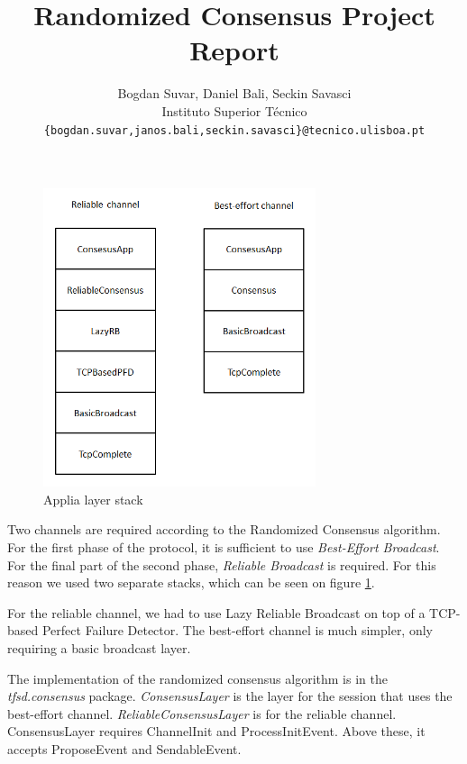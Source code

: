 \documentclass[times, 12pt,twocolumn]{article}
\begin{document}
\title{Randomized Consensus Project Report}

\author{Bogdan Suvar, Daniel Bali, Seckin Savasci\\
Instituto Superior T\'{e}cnico\\
\texttt{\{bogdan.suvar,janos.bali,seckin.savasci\}@tecnico.ulisboa.pt}\\
}
 
\maketitle
\thispagestyle{empty}




\begin{figure}[ht!]
\centering
\includegraphics[width=80mm]{stack.png}
\caption{Applia layer stack}
\label{fig:stack}
\end{figure}

Two channels are required according to the Randomized Consensus algorithm. 
For the first phase of the protocol, it is sufficient to use 
\textit{Best-Effort Broadcast}. For the final part of the second phase, 
\textit{Reliable Broadcast} is required. For this reason we used two 
separate stacks, which can be seen on figure \ref{fig:stack}.

For the reliable channel, we had to use Lazy Reliable Broadcast on top
of a TCP-based Perfect Failure Detector. The best-effort channel is much simpler, 
only requiring a basic broadcast layer.

The implementation of the randomized consensus algorithm is in the 
\textit{tfsd.consensus} package. \textit{ConsensusLayer} is the layer for the 
session that uses the best-effort channel. \textit{ReliableConsensusLayer} is for 
the reliable channel. ConsensusLayer requires ChannelInit and ProcessInitEvent. 
Above these, it accepts ProposeEvent and SendableEvent.
\end{document}
